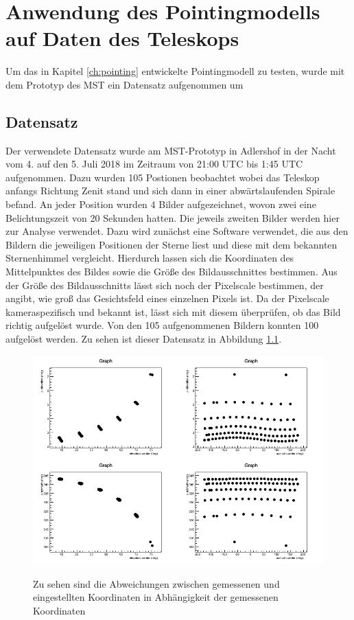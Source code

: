 \chapter{Anwendung des Pointingmodells auf Daten des Teleskops}
\label{ch:auswertung}
Um das in Kapitel \ref{ch:pointing} entwickelte Pointingmodell zu testen, wurde mit dem Prototyp des MST ein Datensatz aufgenommen um
\section{Datensatz}
Der verwendete Datensatz wurde am MST-Prototyp in Adlershof in der Nacht vom 4. auf den 5. Juli 2018 im Zeitraum von 21:00 UTC bis 1:45 UTC aufgenommen. Dazu wurden 105 Postionen beobachtet wobei das Teleskop anfangs Richtung Zenit stand und sich dann in einer abwärtslaufenden Spirale befand. An jeder Position wurden 4 Bilder aufgezeichnet, wovon zwei eine Belichtungszeit von 20 Sekunden hatten. Die jeweils zweiten Bilder werden hier zur Analyse verwendet. Dazu wird zunächst eine Software verwendet, die aus den Bildern die jeweiligen Positionen der Sterne liest und diese mit dem bekannten Sternenhimmel vergleicht. Hierdurch lassen sich die Koordinaten des Mittelpunktes des Bildes sowie die Größe des Bildausschnittes bestimmen. Aus der Größe des Bildausschnitts lässt sich noch der Pixelscale bestimmen, der angibt, wie groß das Gesichtsfeld eines einzelnen Pixels ist. Da der Pixelscale kameraspezifisch und bekannt ist, lässt sich mit diesem überprüfen, ob das Bild richtig aufgelöst wurde. Von den 105 aufgenommenen Bildern konnten 100 aufgelöst werden. Zu sehen ist dieser Datensatz in Abbildung \ref{img:dataset}.
\begin{figure}[htbp]
\centering
\includegraphics[width=\textwidth]{../341/data2.png}
\label{img:dataset}
\caption{Zu sehen sind die Abweichungen zwischen gemessenen und eingestellten Koordinaten in Abhängigkeit der gemessenen Koordinaten}
\end{figure}
